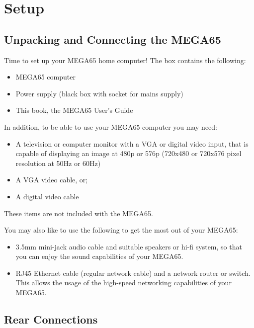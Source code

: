 \chapter{Setup}
\section{Unpacking and Connecting the MEGA65}
Time to set up your MEGA65 home computer!
The box contains the following:
\begin{itemize}
\setlength\itemsep{-0.75mm}
\item MEGA65 computer
\item Power supply (black box with socket for mains supply)
\item This book, the MEGA65 User's Guide
\end{itemize}

In addition, to be able to use your MEGA65 computer you may need:
\begin{itemize}
	\item A television or computer monitor with a VGA or digital video input, that is capable of displaying an image at 480p or 576p (720x480 or 720x576 pixel resolution at 50Hz or 60Hz)
\item A VGA video cable, or;
\item A digital video cable
\end{itemize}

These items are not included with the MEGA65.

You may also like to use the following to get the most out of your MEGA65:
\begin{itemize}
\item 3.5mm mini-jack audio cable and suitable speakers or hi-fi system, so that you can enjoy the sound capabilities of your MEGA65.
\item RJ45 Ethernet cable (regular network cable) and a network router or switch. This allows the usage of the high-speed networking capabilities of your MEGA65.
\end{itemize}

\section{Rear Connections}

